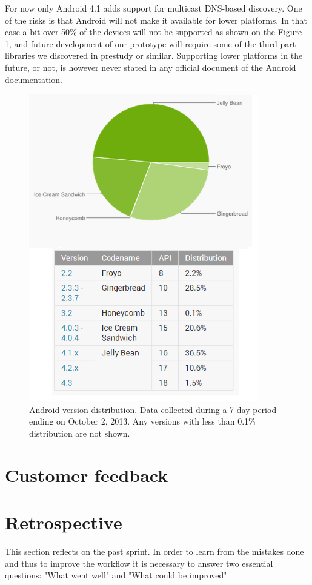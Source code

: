 For now only Android 4.1 adds support for multicast DNS-based discovery.
One of the risks is that Android will not make it available for lower platforms.
In that case a bit over 50\% of the devices will not be supported as shown on the Figure \ref{fig:Platform_chart }, and future development of our prototype will require some of the third part libraries we discovered in prestudy or similar.
Supporting lower platforms in the future, or not, is however never stated in any official document of the Android documentation.

\begin{figure}[H]
	\centering
		\includegraphics[width=10cm]{sprint1/android_platform_chart.png}
	\caption[Android version distribution]{Android version distribution. Data collected during a 7-day period ending on October 2, 2013. 
	Any versions with less than 0.1\% distribution are not shown.}
	\label{fig:Platform_chart }
\end{figure}

\section{Customer feedback}

\section{Retrospective}
This section reflects on the past sprint. In order to learn from the mistakes done and thus to improve the workflow it is necessary to answer two essential questions: "What went well" and "What could be improved".

